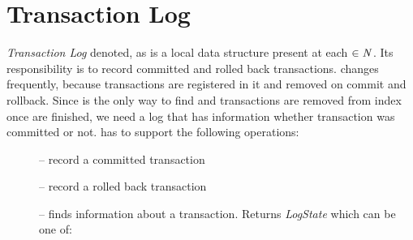 
\section{Transaction Log}
\label{sec:mpp:transactionLog}
\emph{Transaction Log} denoted, as \txLog is a local data structure present at each $\in\text{$\mathit{N}$}$. Its responsibility is to record committed and rolled back transactions. \txIndex changes frequently, because transactions are registered in it and removed on commit and rollback. Since \txIndex is the only way to find \paxosRoundId and transactions are removed from index once are finished, we need a log that has information whether transaction was committed or not. \txLog has to support the following operations:
\begin{description}
\item[] -- record a committed transaction
\item[] -- record a rolled back transaction
\item[] -- finds information about a transaction. Returns \emph{LogState} which can be one of:  
\end{description}
